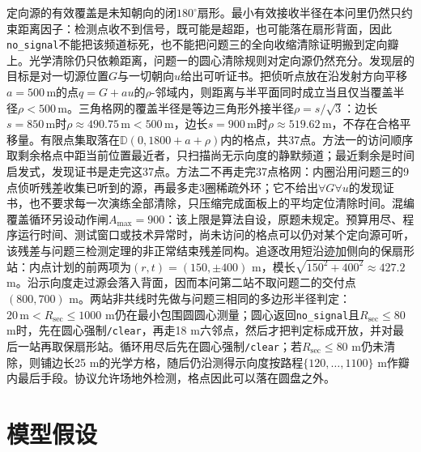 \documentclass{cumcmthesis}
\begin{document}
定向源的有效覆盖是未知朝向的闭$180^\circ$扇形。最小有效接收半径在本问里仍然只约束距离因子：检测点收不到信号，既可能是超距，也可能落在扇形背面，因此\texttt{no\_signal}不能把该频道标死，也不能把问题三的全向收缩清除证明搬到定向瓣上。光学清除仍只依赖距离，问题一的圆心清除规则对定向源仍然充分。发现层的目标是对一切源位置$G$与一切朝向$u$给出可听证书。把侦听点放在沿发射方向平移$a=500\,\mathrm{m}$的点$q=G+au$的$\rho$-邻域内，则距离与半平面同时成立当且仅当覆盖半径$\rho<500\,\mathrm{m}$。三角格网的覆盖半径是等边三角形外接半径$\rho=s/\sqrt{3}$：边长$s=850\,\mathrm{m}$时$\rho\approx 490.75\,\mathrm{m}<500\,\mathrm{m}$，边长$s=900\,\mathrm{m}$时$\rho\approx 519.62\,\mathrm{m}$，不存在合格平移量。有限点集取落在$\mathbb{D}(0,1800+a+\rho)$内的格点，共37点。方法一的访问顺序取剩余格点中距当前位置最近者，只扫描尚无示向度的静默频道；最近剩余是时间启发式，发现证书是走完这37点。方法二不再走完37点格网：内圈沿用问题三的9点侦听残差收集已听到的源，再最多走3圈稀疏外环；它不给出$\forall G\forall u$的发现证书，也不要求每一次演练全部清除，只压缩完成面板上的平均定位清除时间。混编覆盖循环另设动作闸$A_{\max}=900$：该上限是算法自设，原题未规定。预算用尽、程序运行时间、测试窗口或技术异常时，尚未访问的格点可以仍对某个定向源可听，该残差与问题三检测定理的非正常结束残差同构。追逐改用短沿迹加侧向的保扇形站：内点计划的前两项为$(r,t)=(150,\pm 400)$ m，模长$\sqrt{150^2+400^2}\approx 427.2$ m。沿示向度走过源会落入背面，因而本问第二站不取问题二的交付点$(800,700)$ m。两站非共线时先做与问题三相同的多边形半径判定：$20\,\mathrm{m}<R_{\mathrm{sec}}\le 1000$ m仍在最小包围圆圆心测量；圆心返回\texttt{no\_signal}且$R_{\mathrm{sec}}\le 80$ m时，先在圆心强制\texttt{/clear}，再走18 m六邻点，然后才把判定标成开放，并对最后一站再取保扇形站。循环用尽后先在圆心强制\texttt{/clear}；若$R_{\mathrm{sec}}\le 80$ m仍未清除，则铺边长25 m的光学方格，随后仍沿测得示向度按路程$\{120,\ldots,1100\}$ m作瓣内最后手段。协议允许场地外检测，格点因此可以落在圆盘之外。

\section{模型假设}
\end{document}

